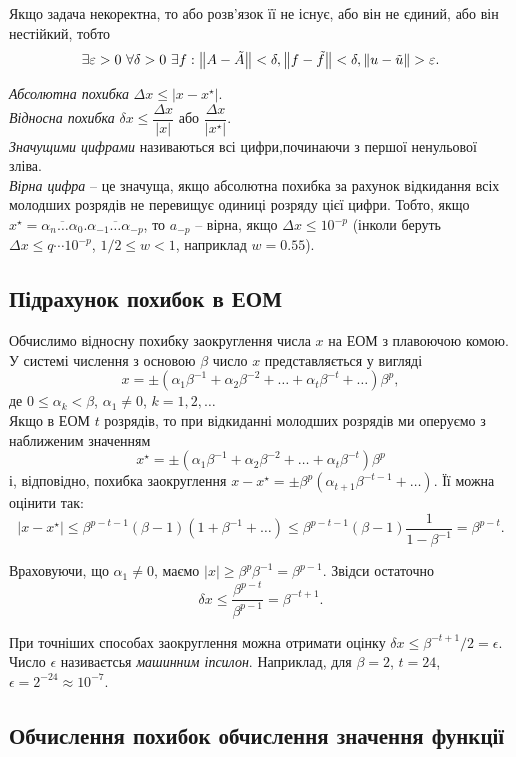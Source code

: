 Якщо задача  некоректна, то або розв'язок її не існує, або він не єдиний, або він нестійкий, тобто \[\exists \epsilon > 0 \ws \forall \delta > 0 \ws \exists f: \left\|A-\tilde A\right\|<\delta, \left\|f-\tilde f\right\|<\delta, \left\|u-\tilde u\right\|>\epsilon.\]

\textit{Абсолютна похибка} $\Delta x\le |x-x^\star|$.\\

\textit{Відносна похибка} $\delta x\le \dfrac{\Delta x}{|x|}$ або $\dfrac{\Delta x}{|x^\star|}$.\\

\textit{Значущими цифрами} називаються всі цифри,починаючи з першої ненульової зліва.\\ 

\textit{Вірна цифра} -- це значуща, якщо абсолютна похибка за рахунок відкидання всіх молодших розрядів не перевищує одиниці розряду цієї цифри. Тобто, якщо $x^\star = \overline{\alpha_n\ldots\alpha_0}.\overline{\alpha_{-1}\ldots\alpha_{-p}}$, то $a_{-p}$ -- вірна, якщо $\Delta x\le 10^{-p}$ (інколи беруть $\Delta x\le q\cdots 10^{-p}$, $1/2\le w<1$, наприклад $w=0.55$).

\subsection{Підрахунок похибок в ЕОМ}

Обчислимо відносну похибку заокруглення числа $x$ на ЕОМ з плавоючою комою. У системі числення з основою $\beta$ число $x$ представляється у вигляді \begin{equation} \label{eq:x-beta-basis} x=\pm\left(\alpha_1\beta^{-1}+\alpha_2\beta^{-2}+\ldots+\alpha_t\beta^{-t}+\ldots\right)\beta^p, \end{equation} де $0\le\alpha_k<\beta$, $\alpha_1\ne0$, $k=1,2,\ldots$\\

Якщо в ЕОМ $t$ розрядів, то при відкиданні молодших розрядів ми оперуємо з наближеним значенням \[x^\star = \pm\left(\alpha_1\beta^{-1}+\alpha_2\beta^{-2}+\ldots+\alpha_t\beta^{-t}\right)\beta^p\] і, відповідно, похибка заокруглення $x-x^\star = \pm \beta^p\left(\alpha_{t+1}\beta^{-t-1}+\ldots\right)$. Її можна оцінити так: \[|x-x^\star|\le \beta^{p-t-1}(\beta-1)(1+\beta^{-1}+\ldots)\le \beta^{p-t-1}(\beta - 1)\dfrac1{1-\beta^{-1}}=\beta^{p-t}.\]

Враховуючи, що $\alpha_1\ne 0$, маємо $|x|\ge \beta^p\beta^{-1}=\beta^{p-1}$. Звідси остаточно \[\delta x\le \dfrac{\beta^{p-t}}{\beta^{p-1}}=\beta^{-t+1}.\]

При точніших способах заокруглення можна отримати оцінку $\delta x\le \beta^{-t+1}/2=\epsilon$. Число $\epsilon$ називаєтсья \textit{машинним іпсилон}. Наприклад, для $\beta=2$, $t=24$, $\epsilon=2^{-24}\approx 10^{-7}$. 

\subsection{Обчислення похибок обчислення значення функції}



